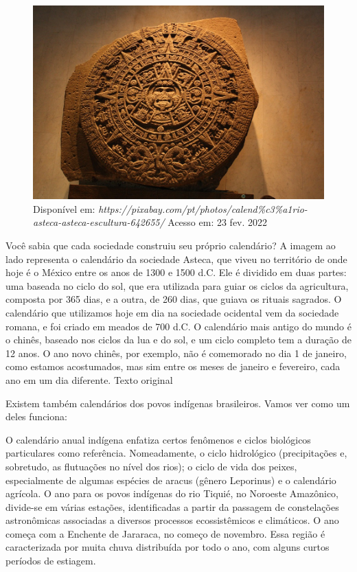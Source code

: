 \begin{figure}[htpb!]
\includegraphics[width=.5\textwidth]{./imgs/img32.png}
\caption{Disponível em: {\emph{https://pixabay.com/pt/photos/calend\%c3\%a1rio-asteca-asteca-escultura-642655/}} Acesso em: 23 fev. 2022}
\end{figure}

Você sabia que cada sociedade construiu seu próprio calendário? A imagem
ao lado representa o calendário da sociedade Asteca, que viveu no
território de onde hoje é o México entre os anos de 1300 e 1500 d.C. Ele
é dividido em duas partes: uma baseada no ciclo do sol, que era
utilizada para guiar os ciclos da agricultura, composta por 365 dias, e
a outra, de 260 dias, que guiava os rituais sagrados. O calendário que
utilizamos hoje em dia na sociedade ocidental vem da sociedade romana, e
foi criado em meados de 700 d.C. O calendário mais antigo do mundo é o
chinês, baseado nos ciclos da lua e do sol, e um ciclo completo tem a
duração de 12 anos. O ano novo chinês, por exemplo, não é comemorado no
dia 1 de janeiro, como estamos acostumados, mas sim entre os meses de
janeiro e fevereiro, cada ano em um dia diferente. Texto original

Existem também calendários dos povos indígenas brasileiros. Vamos ver
como um deles funciona:

O calendário anual indígena enfatiza certos fenômenos e ciclos
biológicos particulares como referência. Nomeadamente, o ciclo
hidrológico (precipitações e, sobretudo, as flutuações no nível dos
rios); o ciclo de vida dos peixes, especialmente de algumas espécies de
aracus (gênero Leporinus) e o calendário agrícola. O ano para os povos
indígenas do rio Tiquié, no Noroeste Amazônico, divide-se em várias
estações, identificadas a partir da passagem de constelações
astronômicas associadas a diversos processos ecossistêmicos e
climáticos. O ano começa com a Enchente de Jararaca, no começo de
novembro. Essa região é caracterizada por muita chuva distribuída por
todo o ano, com alguns curtos períodos de estiagem.



